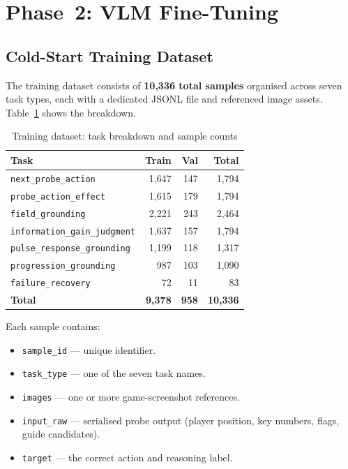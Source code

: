 \documentclass[11pt,a4paper]{article}
\begin{document}
\section{Phase~2: VLM Fine-Tuning}

\subsection{Cold-Start Training Dataset}

The training dataset consists of \textbf{10,336 total samples} organised across seven task types, each with a dedicated JSONL file and referenced image assets. Table~\ref{tab:tasks} shows the breakdown.

\begin{table}[H]
\centering
\caption{Training dataset: task breakdown and sample counts}
\label{tab:tasks}
\begin{tabular}{@{}lrrr@{}}
\toprule
\textbf{Task} & \textbf{Train} & \textbf{Val} & \textbf{Total} \\
\midrule
\texttt{next\_probe\_action}      & 1,647 & 147 & 1,794 \\
\texttt{probe\_action\_effect}    & 1,615 & 179 & 1,794 \\
\texttt{field\_grounding}         & 2,221 & 243 & 2,464 \\
\texttt{information\_gain\_judgment} & 1,637 & 157 & 1,794 \\
\texttt{pulse\_response\_grounding}  & 1,199 & 118 & 1,317 \\
\texttt{progression\_grounding}   & 987   & 103 & 1,090 \\
\texttt{failure\_recovery}        & 72    & 11  & 83 \\
\midrule
\textbf{Total} & \textbf{9,378} & \textbf{958} & \textbf{10,336} \\
\bottomrule
\end{tabular}
\end{table}

Each sample contains:
\begin{itemize}[leftmargin=*,itemsep=2pt]
  \item \texttt{sample\_id} — unique identifier.
  \item \texttt{task\_type} — one of the seven task names.
  \item \texttt{images} — one or more game-screenshot references.
  \item \texttt{input\_raw} — serialised probe output (player position, key numbers, flags, guide candidates).
  \item \texttt{target} — the correct action and reasoning label.
\end{itemize}
\end{document}
